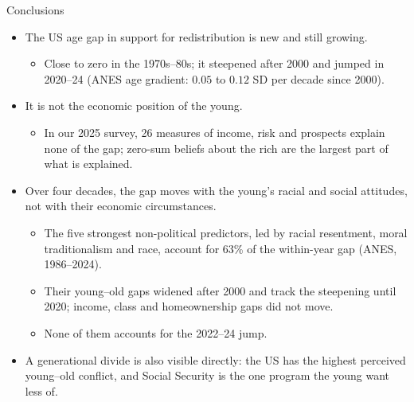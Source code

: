\documentclass[aspectratio=169]{beamer}
\begin{document}
\begin{frame}{Conclusions}

\begin{itemize}
    \item The US age gap in support for redistribution is new and still growing.
    \begin{itemize}
        \item Close to zero in the 1970s--80s; it steepened after 2000 and jumped in 2020--24 (ANES age gradient: $0.05$ to $0.12$ SD per decade since 2000).
    \end{itemize}
    \item It is not the economic position of the young.
    \begin{itemize}
        \item In our 2025 survey, 26 measures of income, risk and prospects explain none of the gap; zero-sum beliefs about the rich are the largest part of what is explained.
    \end{itemize}
    \item Over four decades, the gap moves with the young's racial and social attitudes, not with their economic circumstances.
    \begin{itemize}
        \item The five strongest non-political predictors, led by racial resentment, moral traditionalism and race, account for 63\% of the within-year gap (ANES, 1986--2024).
        \item Their young--old gaps widened after 2000 and track the steepening until 2020; income, class and homeownership gaps did not move.
        \item None of them accounts for the 2022--24 jump.
    \end{itemize}
    \item A generational divide is also visible directly: the US has the highest perceived young--old conflict, and Social Security is the one program the young want less of.
\end{itemize}

\end{frame}
\end{document}
